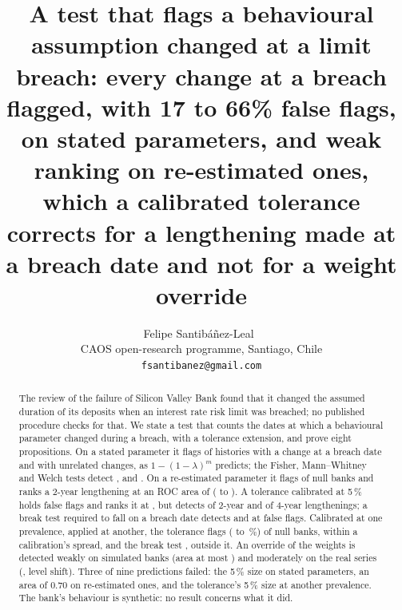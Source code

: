 \documentclass[11pt]{article}
\title{A test that flags a behavioural assumption changed at a limit breach: every change at a breach flagged, with 17 to 66\% false flags, on stated parameters, and weak ranking on re-estimated ones, which a calibrated tolerance corrects for a lengthening made at a breach date and not for a weight override}
\author{Felipe Santib\'a\~nez-Leal~\orcidlink{0000-0002-0150-3246}\\
\small CAOS open-research programme, Santiago, Chile\\
\small \texttt{fsantibanez@gmail.com}}
\date{\docdate}
\begin{document}
\maketitle
\headerblock

\begin{abstract}
The review of the failure of Silicon Valley Bank found that it changed the assumed duration of its deposits when an interest rate risk limit was breached; no published procedure checks for that.
We state a test that counts the dates at which a behavioural parameter changed during a breach, with a tolerance extension, and prove eight propositions.
On a stated parameter it flags \statedAltEngine{} of histories with a change at a breach date and \statedNullEngine{} with unrelated changes, as $1-(1-\lambda)^m$ predicts; the Fisher, Mann--Whitney and Welch tests detect \statedAltFisher{}, \statedAltMw{} and \statedAltWelch{}.
On a re-estimated parameter it flags \fitNullEngine{} of null banks and ranks a 2-year lengthening at an ROC area of \fitAucCEngine{} (\fitAucLoCEngine{} to \fitAucHiCEngine{}).
A tolerance calibrated at 5\,\% holds \fitNullTol{} false flags and ranks it at \fitAucCTol{}, but detects \fitAddCTol{} of 2-year and \fitAddDTol{} of 4-year lengthenings; a break test required to fall on a breach date detects \fitAddCShiftB{} and \fitAddDShiftB{} at \fitNullShiftB{} false flags.
Calibrated at one prevalence, applied at another, the tolerance flags \fitMisCTol{} (\fitMisCTolLo{} to \fitMisCTolHi{}\,\%) of null banks, within a calibration's spread, and the break test \fitMisCShiftB{}, outside it. An override of the weights is detected weakly on simulated banks (area at most \wTopAuc{}) and moderately on the real series (\wRealTopAuc{}, level shift).
Three of nine predictions failed: the 5\,\% size on stated parameters, an area of 0.70 on re-estimated ones, and the tolerance's 5\,\% size at another prevalence.
The bank's behaviour is synthetic: no result concerns what it did.
\end{abstract}
















\end{document}
